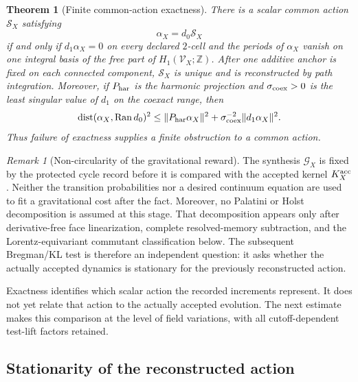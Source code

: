 \documentclass[11pt]{article}
\newtheorem{theorem}{Theorem}[section]
\numberwithin{equation}{section}
\theoremstyle{definition}
\theoremstyle{remark}
\newtheorem{remark}[remark]{Remark}
\newcommand{\Z}{\mathbb Z}
\newcommand{\Ran}{\operatorname{Ran}}
\begin{document}
\begin{theorem}[Finite common-action exactness]
\label{thm:main-common-action}
There is a scalar common action $\mathscr S_X$ satisfying
\begin{equation}
 \boxed{\alpha_X=d_0\mathscr S_X}
 \label{eq:main-common-action}
\end{equation}
if and only if $d_1\alpha_X=0$ on every declared $2$-cell and the periods of
$\alpha_X$ vanish on one integral basis of the free part of $H_1(\mathscr V_X;\Z)$.  After one
additive anchor is fixed on each connected component, $\mathscr S_X$ is unique and is reconstructed by path
integration.  Moreover, if $P_{\rm har}$ is the harmonic projection and
$\sigma_{\rm coex}>0$ is the least singular value of $d_1$ on the coexact
range, then
\begin{equation}
 \operatorname{dist}(\alpha_X,\Ran d_0)^2
 \le \|P_{\rm har}\alpha_X\|^2
 +\sigma_{\rm coex}^{-2}\|d_1\alpha_X\|^2.
 \label{eq:main-common-action-obstruction}
\end{equation}
Thus failure of exactness supplies a finite obstruction to a common action.
\end{theorem}

\begin{remark}[Non-circularity of the gravitational reward]
\label{rem:main-gravitational-reward-noncircular}
The synthesis $\mathscr G_X$ is fixed by the protected cycle record before it is
compared with the accepted kernel $K_X^{\rm acc}$.  Neither the transition
probabilities nor a desired continuum equation are used to fit a gravitational
cost after the fact.  Moreover, no Palatini or Holst decomposition is assumed at
this stage.  That decomposition appears only after derivative-free face
linearization, complete resolved-memory subtraction, and the Lorentz-equivariant
commutant classification below.  The subsequent Bregman/KL test is therefore an
independent question: it asks whether the actually accepted dynamics is
stationary for the previously reconstructed action.
\end{remark}

Exactness identifies which scalar action the recorded increments represent.
It does not yet relate that action to the actually accepted evolution.
The next estimate makes this comparison at the level of field variations,
with all cutoff-dependent test-lift factors retained.

\subsection{Stationarity of the reconstructed action}
\end{document}
